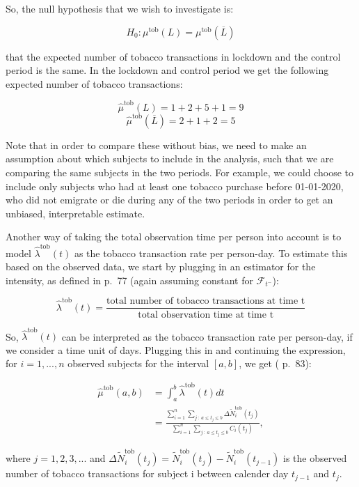 \documentclass[
  11pt,
]{article}
\begin{document}
So, the null hypothesis that we wish to investigate is:

\[
H_0: \mu^{\text{tob}}(L)=\mu^{\text{tob}}(\overline{L})
\]

that the expected number of tobacco transactions in lockdown and the
control period is the same. In the lockdown and control period we get
the following expected number of tobacco transactions:

\[
\hat{\mu}^{\text{tob}}(L)= 1+2+5+1=9
\] \[
\hat{\mu}^{\text{tob}}(\overline{L})= 2+1+2=5
\]

Note that in order to compare these without bias, we need to make an
assumption about which subjects to include in the analysis, such that we
are comparing the same subjects in the two periods. For example, we
could choose to include only subjects who had at least one tobacco
purchase before 01-01-2020, who did not emigrate or die during any of
the two periods in order to get an unbiased, interpretable estimate.

Another way of taking the total observation time per person into account
is to model \(\hat{\lambda}^{\text{tob}}(t)\) as the tobacco transaction
rate per person-day. To estimate this based on the observed data, we
start by plugging in an estimator for the intensity, as defined in
\cite{marubini} p.~77 (again assuming constant for
\(\mathcal{F}_{t^-}\)):

\[
\hat{\lambda}^{\text{tob}}(t)=\frac{\text{total number of tobacco transactions at time t}}{\text{total observation time at time t}}
\]

So, \(\hat{\lambda}^{\text{tob}}(t)\) can be interpreted as the tobacco
transaction rate per person-day, if we consider a time unit of days.
Plugging this in and continuing the expression, for \(i=1,...,n\)
observed subjects for the interval \([a,b]\), we get (\cite{marubini}
p.~83):

\begin{align*}
\hat{\mu}^{\text{tob}}(a, b) &= \int_a^b \hat{\lambda}^{\text{tob}} (t) dt \\
&=\frac{\sum_{i=1}^n \sum_{j \ : \ a \leq t_j \leq b} \Delta \tilde{N}_i^{\text{tob}}(t_j)}{\sum_{i=1}^n \sum_{j \ : \ a \leq t_j \leq b} C_i(t_j)},
\end{align*}

where \(j=1,2,3,...\) and
\(\Delta \tilde{N}_i^{\text{tob}}(t_j)=\tilde{N}_i^{\text{tob}}(t_j)-\tilde{N}_i^{\text{tob}}(t_{j-1})\)
is the observed number of tobacco transactions for subject i between
calender day \(t_{j-1}\) and \(t_j\).
\end{document}
